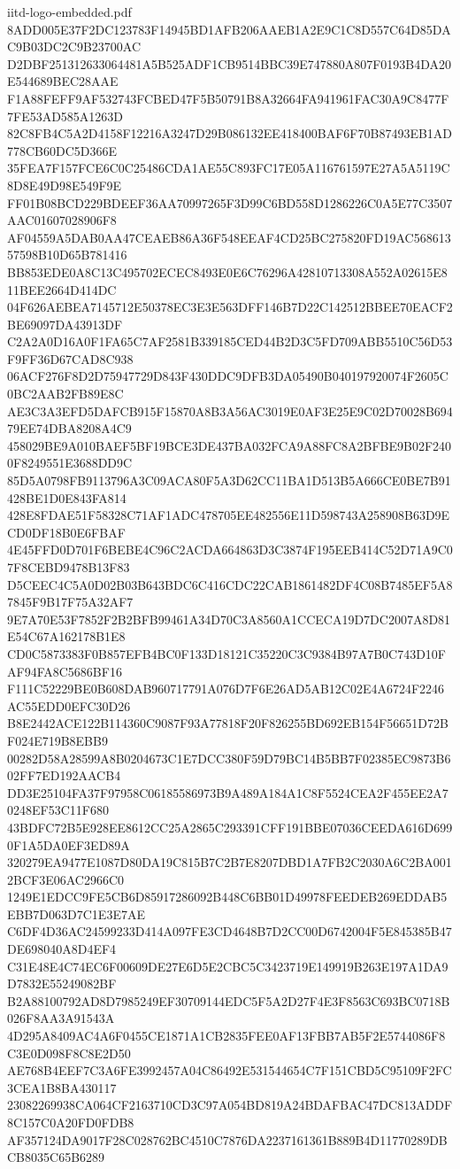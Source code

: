 \begin{filecontents*}[overwrite]{iitd-logo-embedded.pdf}
8ADD005E37F2DC123783F14945BD1AFB206AAEB1A2E9C1C8D557C64D85DAC9B03DC2C9B23700AC
D2DBF251312633064481A5B525ADF1CB9514BBC39E747880A807F0193B4DA20E544689BEC28AAE
F1A88FEFF9AF532743FCBED47F5B50791B8A32664FA941961FAC30A9C8477F7FE53AD585A1263D
82C8FB4C5A2D4158F12216A3247D29B086132EE418400BAF6F70B87493EB1AD778CB60DC5D366E
35FEA7F157FCE6C0C25486CDA1AE55C893FC17E05A116761597E27A5A5119C8D8E49D98E549F9E
FF01B08BCD229BDEEF36AA70997265F3D99C6BD558D1286226C0A5E77C3507AAC01607028906F8
AF04559A5DAB0AA47CEAEB86A36F548EEAF4CD25BC275820FD19AC56861357598B10D65B781416
BB853EDE0A8C13C495702ECEC8493E0E6C76296A42810713308A552A02615E811BEE2664D414DC
04F626AEBEA7145712E50378EC3E3E563DFF146B7D22C142512BBEE70EACF2BE69097DA43913DF
C2A2A0D16A0F1FA65C7AF2581B339185CED44B2D3C5FD709ABB5510C56D53F9FF36D67CAD8C938
06ACF276F8D2D75947729D843F430DDC9DFB3DA05490B040197920074F2605C0BC2AAB2FB89E8C
AE3C3A3EFD5DAFCB915F15870A8B3A56AC3019E0AF3E25E9C02D70028B69479EE74DBA8208A4C9
458029BE9A010BAEF5BF19BCE3DE437BA032FCA9A88FC8A2BFBE9B02F2400F8249551E3688DD9C
85D5A0798FB9113796A3C09ACA80F5A3D62CC11BA1D513B5A666CE0BE7B91428BE1D0E843FA814
428E8FDAE51F58328C71AF1ADC478705EE482556E11D598743A258908B63D9ECD0DF18B0E6FBAF
4E45FFD0D701F6BEBE4C96C2ACDA664863D3C3874F195EEB414C52D71A9C07F8CEBD9478B13F83
D5CEEC4C5A0D02B03B643BDC6C416CDC22CAB1861482DF4C08B7485EF5A87845F9B17F75A32AF7
9E7A70E53F7852F2B2BFB99461A34D70C3A8560A1CCECA19D7DC2007A8D81E54C67A162178B1E8
CD0C5873383F0B857EFB4BC0F133D18121C35220C3C9384B97A7B0C743D10FAF94FA8C5686BF16
F111C52229BE0B608DAB960717791A076D7F6E26AD5AB12C02E4A6724F2246AC55EDD0EFC30D26
B8E2442ACE122B114360C9087F93A77818F20F826255BD692EB154F56651D72BF024E719B8EBB9
00282D58A28599A8B0204673C1E7DCC380F59D79BC14B5BB7F02385EC9873B602FF7ED192AACB4
DD3E25104FA37F97958C06185586973B9A489A184A1C8F5524CEA2F455EE2A70248EF53C11F680
43BDFC72B5E928EE8612CC25A2865C293391CFF191BBE07036CEEDA616D6990F1A5DA0EF3ED89A
320279EA9477E1087D80DA19C815B7C2B7E8207DBD1A7FB2C2030A6C2BA0012BCF3E06AC2966C0
1249E1EDCC9FE5CB6D85917286092B448C6BB01D49978FEEDEB269EDDAB5EBB7D063D7C1E3E7AE
C6DF4D36AC24599233D414A097FE3CD4648B7D2CC00D6742004F5E845385B47DE698040A8D4EF4
C31E48E4C74EC6F00609DE27E6D5E2CBC5C3423719E149919B263E197A1DA9D7832E55249082BF
B2A88100792AD8D7985249EF30709144EDC5F5A2D27F4E3F8563C693BC0718B026F8AA3A91543A
4D295A8409AC4A6F0455CE1871A1CB2835FEE0AF13FBB7AB5F2E5744086F8C3E0D098F8C8E2D50
AE768B4EEF7C3A6FE3992457A04C86492E531544654C7F151CBD5C95109F2FC3CEA1B8BA430117
23082269938CA064CF2163710CD3C97A054BD819A24BDAFBAC47DC813ADDF8C157C0A20FD0FDB8
AF357124DA9017F28C028762BC4510C7876DA2237161361B889B4D11770289DBCB8035C65B6289

\end{filecontents*}
